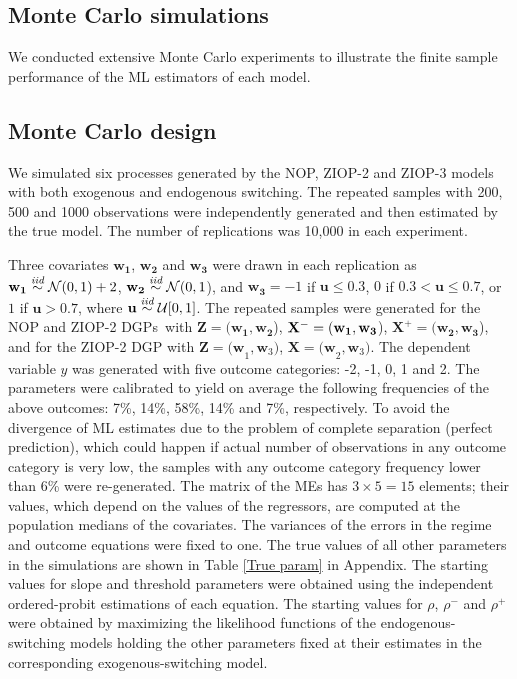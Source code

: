 \documentclass[letterpaper,fleqn,12pt]{article}
\begin{document}
\begin{onehalfspace}
\section{Monte Carlo simulations}

We conducted extensive Monte Carlo experiments to illustrate the finite
sample performance of the ML estimators of each model.

\subsection{Monte Carlo design}

We simulated six processes generated by the NOP, ZIOP-2 and ZIOP-3 models
with both exogenous and endogenous switching. The repeated samples with 200,
500 and 1000 observations were independently generated and then estimated by
the true model. The number of replications was 10,000 in each experiment.

Three covariates $\mathbf{w}_{\mathbf{1}}$, $\mathbf{w}_{\mathbf{2}}$ and $%
\mathbf{w}_{\mathbf{3}}$ were drawn in each replication as\noindent\ $%
\mathbf{w}_{\mathbf{1}}\overset{\emph{iid}}{\sim }\mathcal{N}(0,1)+2$, $%
\mathbf{w}_{\mathbf{2}}\overset{\emph{iid}}{\sim }\mathcal{N}(0,1$), and $%
\mathbf{w}_{\mathbf{3}}=-1$ if $\mathbf{u}\leq 0.3$, $0$ if $0.3<\mathbf{u}%
\leq 0.7$, or $1$ if $\mathbf{u}>0.7$, where $\mathbf{u}\overset{\emph{iid}}{%
\sim }\mathcal{U}[0,1]$. The repeated samples were generated for the NOP and
ZIOP-2 DGPs\textit{\ }with $\mathbf{Z=(w_{1}},\mathbf{w_{2}}$), $\mathbf{%
\mathbf{X}^{-}=(w_{1}},\mathbf{w_{3}}$), $\mathbf{\mathbf{X}^{+}=(w_{2}},%
\mathbf{w_{3}}$), and for the ZIOP-2 DGP with $\mathbf{Z=(w}_{1},\mathbf{w}%
_{3})$, $\mathbf{\mathbf{X}=(w}_{2},\mathbf{w}_{3})$. The dependent variable 
$y$ was generated with five outcome categories: -2, -1, 0, 1 and 2. The
parameters were calibrated to yield on average the following frequencies of
the above outcomes: 7\%, 14\%, 58\%, 14\% and 7\%, respectively. To avoid
the divergence of ML estimates due to the problem of complete separation
(perfect prediction), which could happen if actual number of observations in
any outcome category is very low, the samples with any outcome category
frequency lower than 6\% were re-generated. The matrix of the MEs has $%
3\times 5=15$ elements; their values, which depend on the values of the
regressors, are computed at the population medians of the covariates. The
variances of the errors in the regime and outcome equations were fixed to
one. The true values of all other parameters in the simulations are shown in
Table \ref{True param} in Appendix. The starting values for slope and
threshold parameters were obtained using the independent ordered-probit
estimations of each equation. The starting values for $\rho $, $\rho ^{-}$
and $\rho ^{+}$ were obtained by maximizing the likelihood functions of the
endogenous-switching models holding the other parameters fixed at their
estimates in the corresponding exogenous-switching model.


\end{onehalfspace}
\end{document}
